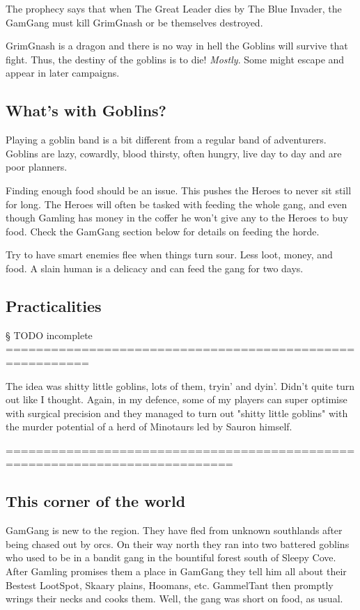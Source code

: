 The prophecy says that when The Great Leader dies by The Blue Invader, the GamGang must kill GrimGnash or be themselves destroyed.

GrimGnash is a dragon and there is no way in hell the Goblins will survive that fight. Thus, the destiny of the goblins is to die! \emph{Mostly}. Some might escape and appear in later campaigns.


\subsection*{What's with Goblins?}

Playing a goblin band is a bit different from a regular band of adventurers. Goblins are lazy, cowardly, blood thirsty, often hungry, live day to day and are poor planners.

Finding enough food should be an issue. This pushes the Heroes to never sit still for long. The Heroes will often be tasked with feeding the whole gang, and even though Gamling has money in the coffer he won't give any to the Heroes to buy food. Check the GamGang section below for details on feeding the horde.

Try to have smart enemies flee when things turn sour. Less loot, money, and food. A slain human is a delicacy and can feed the gang for two days.


\subsection*{Practicalities}

§ TODO incomplete  =========================================================

The idea was shitty little goblins, lots of them, tryin' and dyin'. Didn't quite turn out like I thought. Again, in my defence, some of my players can super optimise with surgical precision and they managed to turn out "shitty little goblins" with the murder potential of a herd of Minotaurs led by Sauron himself.

============================================================================


\subsection*{This corner of the world}

GamGang is new to the region. They have fled from unknown southlands after being chased out by orcs. On their way north they ran into two battered goblins who used to be in a bandit gang in the bountiful forest south of Sleepy Cove. After Gamling promises them a place in GamGang they tell him all about their Bestest LootSpot, Skaary plains, Hoomans, etc. GammelTant then promptly wrings their necks and cooks them. Well, the gang was short on food, as usual.

